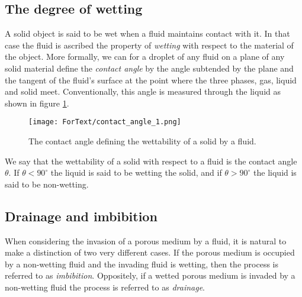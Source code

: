 \documentclass[twoside,utf8]{article}
\begin{document}




\subsection{The degree of wetting}
A solid object is said to be wet when a fluid maintains contact with it. In that case the fluid is ascribed the property of {\it wetting} with respect to the material of the object. More formally, we can for a droplet of any fluid on a plane of any solid material define the {\it contact angle} by the angle subtended by the plane and the tangent of the fluid's surface at the point where the three phases, gas, liquid and solid meet. Conventionally, this angle is measured through the liquid as shown in figure \ref{fig:ContactAngle}.

\begin{figure}[H]
	\begin{center}
	\texttt{[image: ForText/contact\_angle\_1.png]}
	\end{center}
	\caption{The contact angle defining the wettability of a solid by a fluid. }
	\label{fig:ContactAngle}
\end{figure}

\noindent
We say that the wettability of a solid with respect to a fluid is the contact angle $\theta$. If $\theta<90^\circ$ the liquid is said to be wetting the solid, and if $\theta>90^\circ$ the liquid is said to be non-wetting.


\subsection{Drainage and imbibition}
When considering the invasion of a porous medium by a fluid, it is natural to make a distinction of two very different cases. If the porous medium is occupied by a non-wetting fluid and the invading fluid is wetting, then the process is referred to as {\it imbibition}. Oppositely, if a wetted porous medium is invaded by a non-wetting fluid the process is referred to as {\it drainage}.
\end{document}
